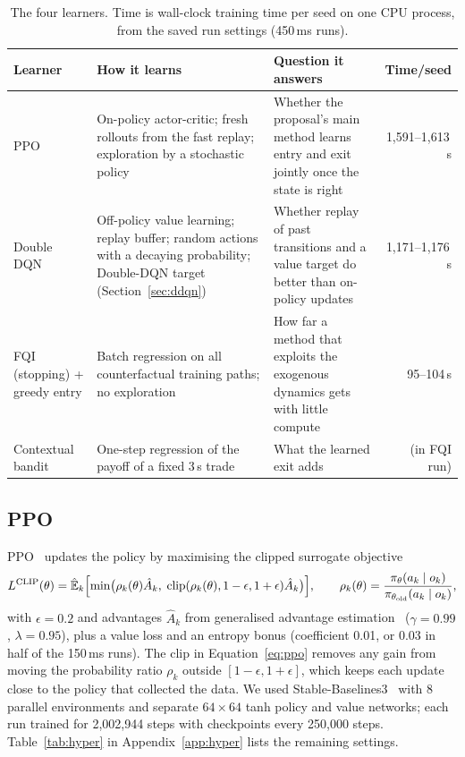 \documentclass[12pt,a4paper]{article}
\newcommand{\E}{\mathbb{E}}
\begin{document}
\begin{table}[!htbp]
\centering
\caption{The four learners. Time is wall-clock training time per seed on one CPU process,
from the saved run settings (450\,ms runs).}
\label{tab:algos}
\small
\begin{tabularx}{\textwidth}{@{}l>{\raggedright\arraybackslash}X>{\raggedright\arraybackslash}X r@{}}
\toprule
Learner & How it learns & Question it answers & Time/seed \\
\midrule
PPO & On-policy actor-critic; fresh rollouts from the fast replay; exploration by a stochastic
policy & Whether the proposal's main method learns entry and exit jointly once the state
is right & 1,591--1,613\,s \\
Double DQN & Off-policy value learning; replay buffer; random actions with a decaying
probability; Double-DQN target (Section~\ref{sec:ddqn}) & Whether replay of past transitions
and a value target do better than on-policy updates & 1,171--1,176\,s \\
FQI (stopping) + greedy entry & Batch regression on all counterfactual training paths; no
exploration & How far a method that exploits the exogenous dynamics gets with little
compute & 95--104\,s \\
Contextual bandit & One-step regression of the payoff of a fixed 3\,s trade & What the
learned exit adds & (in FQI run) \\
\bottomrule
\end{tabularx}
\end{table}

\subsection{PPO}
PPO~\cite{ppo} updates the policy by maximising the clipped surrogate objective
\begin{equation}
L^{\text{CLIP}}(\theta)=\hat{\E}_k\Bigl[\min\bigl(\rho_k(\theta)\hat A_k,\;
\operatorname{clip}(\rho_k(\theta),1-\epsilon,1+\epsilon)\hat A_k\bigr)\Bigr],\qquad
\rho_k(\theta)=\frac{\pi_\theta(a_k\mid o_k)}{\pi_{\theta_{\text{old}}}(a_k\mid o_k)},
\label{eq:ppo}
\end{equation}
with $\epsilon=0.2$ and advantages $\hat A_k$ from generalised advantage estimation~\cite{gae}
($\gamma=0.99$, $\lambda=0.95$), plus a value loss and an entropy bonus (coefficient 0.01, or
0.03 in half of the 150\,ms runs). The clip in Equation~\eqref{eq:ppo} removes any gain from
moving the probability ratio $\rho_k$ outside $[1-\epsilon,1+\epsilon]$, which keeps each
update close to the policy that collected the data. We used Stable-Baselines3~\cite{sb3} with
8 parallel environments and separate $64\times64$ tanh policy and value networks; each run
trained for 2,002,944 steps with checkpoints every 250,000 steps. Table~\ref{tab:hyper} in
Appendix~\ref{app:hyper} lists the remaining settings.
\end{document}

